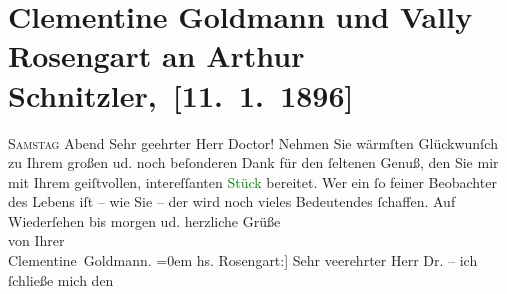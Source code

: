 

               \section[Clementine Goldmann und Vally Rosengart an Arthur Schnitzler, Clementine Goldmann und Vally Rosengart an Arthur Schnitzler, {[}11. 1. 1896{]}]{ Clementine Goldmann und Vally Rosengart an Arthur
               Schnitzler, {[}11. 1. 1896{]}}\nopagebreak{}\rehead{ }\normalsize\beginnumbering{} \toendnotes[C]{\smallbreak\pagebreak[2]} 
\toendnotes[C]{\smallbreak}\pstart
           \raggedleft{}{\pb}\textsc{Samstag}{ }Abend\pend
           \pstart{}Sehr geehrter Herr Doctor!\pend\pstart
           Nehmen Sie wärmſten Glückwunſch zu Ihrem großen \label{K_L02795-1v}\label{K_L02795-1h} ud. noch beſonderen Dank für den
               ſeltenen Genuß, den Sie mir mit Ihrem geiſtvollen, {\pb}intereſſanten \textcolor{green}{Stück}{} bereitet. Wer ein ſo
               feiner Beobachter des Lebens iſt – wie Sie – der wird noch vieles Bedeutendes ſchaffen.\pend
           \pstart
           Auf Wiederſehen bis morgen ud.
               herzliche Grüße{\\[\baselineskip]}von Ihrer{\\[\baselineskip]}\spacefill\mbox{Clementine Goldmann.}\pend
           \leftskip=0em{}\pstart
           \noindent{}{[}hs. Rosengart:{]} Sehr veerehrter Herr Dr. – ich ſchließe mich den
